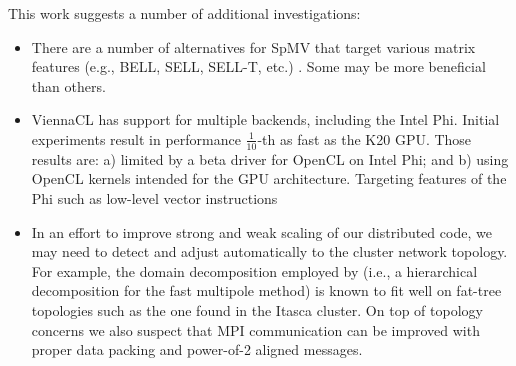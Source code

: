This work suggests a number of additional investigations:
\begin{itemize}
\item There are a number of alternatives for SpMV that target various matrix features (e.g., BELL, SELL, SELL-T, etc.) \cite{Kreutzer2012,SuKeutzer2012}. Some may be more beneficial than others. 

\item ViennaCL has support for multiple backends, including the Intel Phi. Initial experiments result in performance $\frac{1}{10}$-th as fast as the K20 GPU. Those results are: a) limited by a beta driver for OpenCL on Intel Phi; and b) using OpenCL kernels intended for the GPU architecture. Targeting features of the Phi such as low-level vector instructions 

\item  In an effort to improve strong and weak scaling of our distributed code, we may need to detect and adjust automatically to the cluster network topology. For example, the domain decomposition employed by \cite{Yokota2012} (i.e., a hierarchical decomposition for the fast multipole method) is known to fit well on fat-tree topologies such as the one found in the Itasca cluster. On top of topology concerns we also suspect that MPI communication can be improved with proper data packing and power-of-2 aligned messages. 


\end{itemize}
